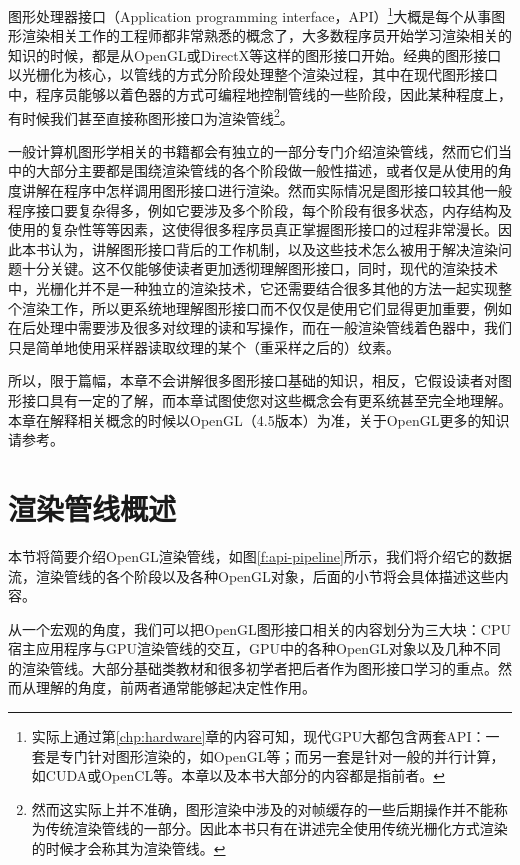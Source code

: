 图形处理器接口（Application programming interface，API）\footnote{实际上通过第\ref{chp:hardware}章的内容可知，现代GPU大都包含两套API：一套是专门针对图形渲染的，如OpenGL等；而另一套是针对一般的并行计算，如CUDA或OpenCL等。本章以及本书大部分的内容都是指前者。}大概是每个从事图形渲染相关工作的工程师都非常熟悉的概念了，大多数程序员开始学习渲染相关的知识的时候，都是从OpenGL或DirectX等这样的图形接口开始。经典的图形接口以光栅化为核心，以管线的方式分阶段处理整个渲染过程，其中在现代图形接口中，程序员能够以着色器的方式可编程地控制管线的一些阶段，因此某种程度上，有时候我们甚至直接称图形接口为渲染管线\footnote{然而这实际上并不准确，图形渲染中涉及的对帧缓存的一些后期操作并不能称为传统渲染管线的一部分。因此本书只有在讲述完全使用传统光栅化方式渲染的时候才会称其为渲染管线。}。

一般计算机图形学相关的书籍都会有独立的一部分专门介绍渲染管线，然而它们当中的大部分主要都是围绕渲染管线的各个阶段做一般性描述，或者仅是从使用的角度讲解在程序中怎样调用图形接口进行渲染。然而实际情况是图形接口较其他一般程序接口要复杂得多，例如它要涉及多个阶段，每个阶段有很多状态，内存结构及使用的复杂性等等因素，这使得很多程序员真正掌握图形接口的过程非常漫长。因此本书认为，讲解图形接口背后的工作机制，以及这些技术怎么被用于解决渲染问题十分关键。这不仅能够使读者更加透彻理解图形接口，同时，现代的渲染技术中，光栅化并不是一种独立的渲染技术，它还需要结合很多其他的方法一起实现整个渲染工作，所以更系统地理解图形接口而不仅仅是使用它们显得更加重要，例如在后处理中需要涉及很多对纹理的读和写操作，而在一般渲染管线着色器中，我们只是简单地使用采样器读取纹理的某个（重采样之后的）纹素。



所以，限于篇幅，本章不会讲解很多图形接口基础的知识，相反，它假设读者对图形接口具有一定的了解，而本章试图使您对这些概念会有更系统甚至完全地理解。本章在解释相关概念的时候以OpenGL（4.5版本）为准，关于OpenGL更多的知识请参考\cite{b:OpenGLProgrammingGuide:TheOfficialGuidetoLearningOpenGLVersion4.3, b:OpenGL4.5CoreProfile, b:TheOpenGLShadingLanguage}。








\section{渲染管线概述}
本节将简要介绍OpenGL渲染管线，如图\ref{f:api-pipeline}所示，我们将介绍它的数据流，渲染管线的各个阶段以及各种OpenGL对象，后面的小节将会具体描述这些内容。

从一个宏观的角度，我们可以把OpenGL图形接口相关的内容划分为三大块：CPU宿主应用程序与GPU渲染管线的交互，GPU中的各种OpenGL对象以及几种不同的渲染管线。大部分基础类教材和很多初学者把后者作为图形接口学习的重点。然而从理解的角度，前两者通常能够起决定性作用。

